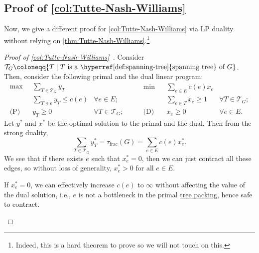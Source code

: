\subsection{Proof of \autoref{col:Tutte-Nash-Williams}}
Now, we give a different proof for \autoref{col:Tutte-Nash-Williams} via LP duality without relying on \autoref{thm:Tutte-Nash-Williams}.\footnote{Indeed, this is a hard theorem to prove so we will not touch on this.}

\begin{proof}[Proof of \autoref{col:Tutte-Nash-Williams}~\cite{chekuri2017near}]\label{pf:col:Tutte-Nash-Williams}
	Consider \(\mathcal{T} _G \coloneqq \{ T \mid T \text{ is a \hyperref[def:spanning-tree]{spanning tree} of } G \} \). Then, consider the following primal and the dual linear program:
	\begin{equation}\label{eq:tree-packing-LP}
		\begin{aligned}
			\max~           & \sum_{T \in \mathcal{T} _G} y_T                                 \\
			                & \sum_{T \ni e} y_T \leq c(e)    & \forall e \in E;              \\
			\text{(P)}\quad & y_T \geq 0                      & \forall T \in \mathcal{T} _G;
		\end{aligned}\qquad
		\begin{aligned}
			\min~           & \sum_{e \in E} c(e) x_e                                   \\
			                & \sum_{e \in T} x_e \geq 1 & \forall T \in \mathcal{T} _G; \\
			\text{(D)}\quad & x_e \geq 0                & \forall e \in E.
		\end{aligned}
	\end{equation}
	Let \(y^{\ast} \) and \(x^{\ast} \) be the optimal solution to the primal and the dual. Then from the strong duality,
	\[
		\sum_{T \in \mathcal{T} _G} y^{\ast} _T
		= \tau _{\text{frac} }(G)
		= \sum_{e \in E} c(e) x^{\ast} _e.
	\]
	We see that if there exists \(e\) such that \(x^{\ast} _e = 0\), then we can just contract all these edges, so without loss of generality, \(x^{\ast} _e > 0\) for all \(e \in E\).

	\begin{intuition}
		If \(x^{\ast} _e = 0\), we can effectively increase \(c(e)\) to \(\infty \) without affecting the value of the dual solution, i.e., \(e\) is not a bottleneck in the primal \hyperref[prb:TP]{tree packing}, hence safe to contract.
	\end{intuition}


\end{proof}
